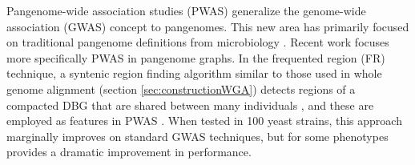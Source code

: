 Pangenome-wide association studies (PWAS) generalize the genome-wide association (GWAS) concept to pangenomes.
This new area has primarily focused on traditional pangenome definitions from microbiology \cite{Brynildsrud_2016}.
Recent work focuses more specifically PWAS in pangenome graphs.
In the frequented region (FR) technique, a syntenic region finding algorithm similar to those used in whole genome alignment (section \ref{sec:constructionWGA}) detects regions of a compacted DBG that are shared between many individuals \cite{cleary2018exploring}, and these are employed as features in PWAS \cite{Manuweera_2019}.
When tested in 100 yeast strains, this approach marginally improves on standard GWAS techniques, but for some phenotypes provides a dramatic improvement in performance.





%

